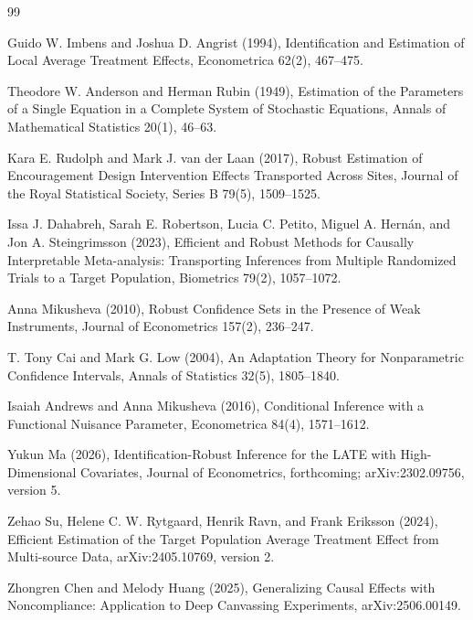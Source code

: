 \documentclass{article}
\begin{document}
\begin{thebibliography}{99}

   Guido W. Imbens and Joshua D. Angrist (1994), Identification and Estimation of Local Average Treatment Effects, Econometrica 62(2), 467--475.

   Theodore W. Anderson and Herman Rubin (1949), Estimation of the Parameters of a Single Equation in a Complete System of Stochastic Equations, Annals of Mathematical Statistics 20(1), 46--63.

   Kara E. Rudolph and Mark J. van der Laan (2017), Robust Estimation of Encouragement Design Intervention Effects Transported Across Sites, Journal of the Royal Statistical Society, Series B 79(5), 1509--1525.

   Issa J. Dahabreh, Sarah E. Robertson, Lucia C. Petito, Miguel A. Hernán, and Jon A. Steingrimsson (2023), Efficient and Robust Methods for Causally Interpretable Meta-analysis: Transporting Inferences from Multiple Randomized Trials to a Target Population, Biometrics 79(2), 1057--1072.

   Anna Mikusheva (2010), Robust Confidence Sets in the Presence of Weak Instruments, Journal of Econometrics 157(2), 236--247.

   T. Tony Cai and Mark G. Low (2004), An Adaptation Theory for Nonparametric Confidence Intervals, Annals of Statistics 32(5), 1805--1840.

   Isaiah Andrews and Anna Mikusheva (2016), Conditional Inference with a Functional Nuisance Parameter, Econometrica 84(4), 1571--1612.

   Yukun Ma (2026), Identification-Robust Inference for the LATE with High-Dimensional Covariates, Journal of Econometrics, forthcoming; arXiv:2302.09756, version 5.

   Zehao Su, Helene C. W. Rytgaard, Henrik Ravn, and Frank Eriksson (2024), Efficient Estimation of the Target Population Average Treatment Effect from Multi-source Data, arXiv:2405.10769, version 2.

   Zhongren Chen and Melody Huang (2025), Generalizing Causal Effects with Noncompliance: Application to Deep Canvassing Experiments, arXiv:2506.00149.

\end{thebibliography}
\end{document}
